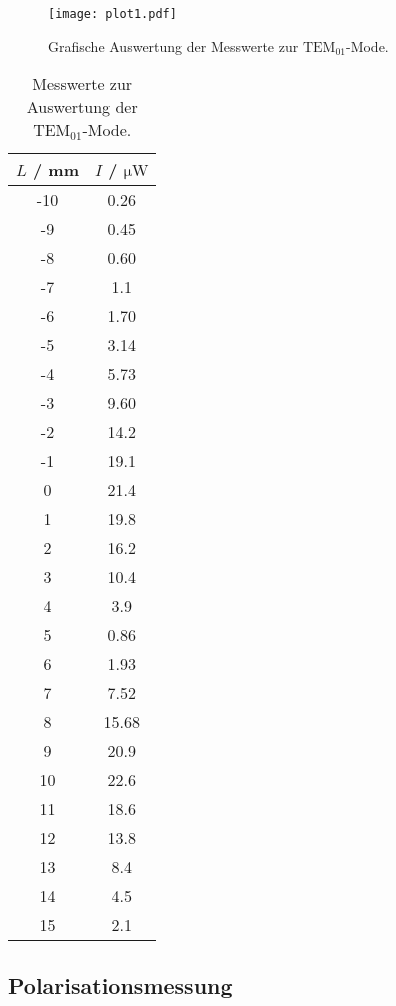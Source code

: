 \begin{figure}[H]
  \centering
  \texttt{[image: plot1.pdf]}
  \caption{Grafische Auswertung der Messwerte zur $\text{TEM}_{01}$-Mode.}
  \label{fig:plot1}
\end{figure}

\begin{table}[H]
  \centering
  \caption{Messwerte zur Auswertung der $\text{TEM}_{01}$-Mode.}
  \label{tab:ersteModeWerte}
  \begin{tabular}{c c}
      \toprule
      $L$ / mm & $I$ / $\si{\micro\watt}$\\
      \midrule
      -10 & 0.26 \\
      -9 & 0.45 \\
      -8 & 0.60 \\
      -7 & 1.1 \\
      -6 & 1.70 \\
      -5 & 3.14 \\
      -4 & 5.73 \\
      -3 & 9.60 \\
      -2 & 14.2 \\
      -1 & 19.1 \\
      0 & 21.4 \\
      1 & 19.8 \\
      2 & 16.2 \\
      3 & 10.4 \\
      4 & 3.9 \\
      5 & 0.86 \\
      6 & 1.93 \\
      7 & 7.52 \\
      8 & 15.68 \\
      9 & 20.9 \\
      10 & 22.6 \\
      11 & 18.6 \\
      12 & 13.8 \\
      13 & 8.4 \\
      14 & 4.5 \\
      15 & 2.1 \\
      \bottomrule
  \end{tabular}
\end{table}




\subsection{Polarisationsmessung}
\label{subsec:Polarisationsmessung}

